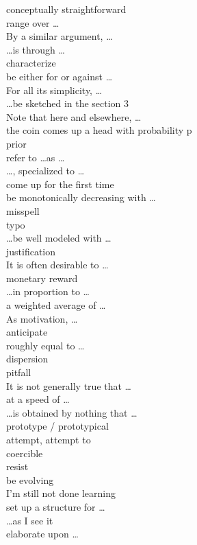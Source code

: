 \documentclass[12pt]{article}
\begin{document}
conceptually straightforward \\
range over \dots \\
By a similar argument, \dots \\
\dots is through \dots \\
characterize \\
be either for or against \dots \\
For all its simplicity, \dots \\
\dots be sketched in the section 3 \\
Note that here and elsewhere, \dots \\
the coin comes up a head with probability p \\
prior \\
refer to \dots as \dots \\
\dots, specialized to \dots \\
come up for the first time \\
be monotonically decreasing with \dots \\
misspell \\
typo \\
\dots be well modeled with \dots \\
justification \\
It is often desirable to \dots \\
monetary reward \\
\dots in proportion to \dots \\
a weighted average of \dots \\
As motivation, \dots \\
anticipate \\
roughly equal to \dots \\
dispersion \\
pitfall \\
It is not generally true that \dots \\
at a speed of \dots \\
\dots is obtained by nothing that \dots \\
prototype / prototypical \\
attempt, attempt to \\
coercible \\
resist \\
be evolving \\
I'm still not done learning \\
set up a structure for \dots \\
\dots as I see it \\
elaborate upon \dots \\
\end{document}
